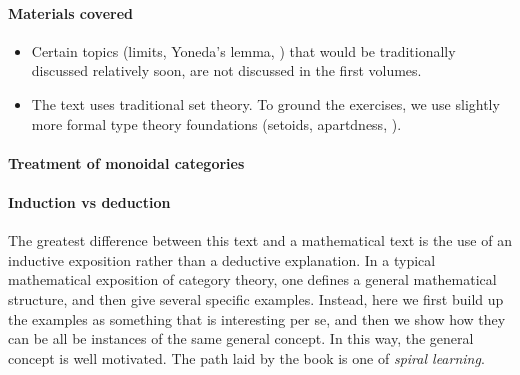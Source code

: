\paragraph{Materials covered}
\begin{itemize}
    \item Certain topics (limits, Yoneda's lemma, \etc) that would be traditionally discussed relatively soon, are not discussed in the first volumes.
    
    \item The text uses traditional set theory.
          To ground the exercises, we use slightly more formal type theory foundations (setoids, apartdness, \etc). 

\end{itemize}

\paragraph{Treatment of monoidal categories}



\paragraph{Induction vs deduction}

The greatest difference between this text and a mathematical text is the use of an inductive exposition rather than a deductive explanation.
In a typical mathematical exposition of category theory, one defines a general mathematical structure, and then give several specific examples. 
Instead, here we first build up the examples as something that is interesting per se, and then we show how they can be all be instances of the same general concept. In this way, the general concept is well motivated.
The path laid by the book is one of \emph{spiral learning}.


